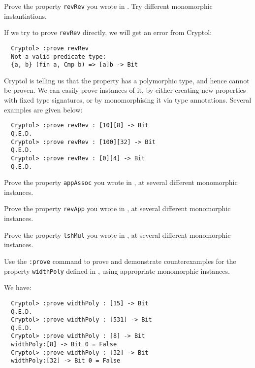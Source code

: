 \begin{Exercise}\label{ex:prove:1}
  Prove the property {\tt revRev} you wrote in
  . Try different
  monomorphic instantiations.
\end{Exercise}
\begin{Answer}
  If we try to prove {\tt revRev} directly, we will get an error from
  Cryptol:
\begin{Verbatim}
  Cryptol> :prove revRev
  Not a valid predicate type:
  {a, b} (fin a, Cmp b) => [a]b -> Bit
\end{Verbatim}
Cryptol is telling us that the property has a polymorphic type, and
hence cannot be proven. We can easily prove instances of it, by either
creating new properties with fixed type signatures\indSignature, or by
monomorphising it via type annotations\indTypeAnnotation. Several
examples are given below:
\begin{Verbatim}
  Cryptol> :prove revRev : [10][8] -> Bit
  Q.E.D.
  Cryptol> :prove revRev : [100][32] -> Bit
  Q.E.D.
  Cryptol> :prove revRev : [0][4] -> Bit
  Q.E.D.
\end{Verbatim}
\end{Answer}

\begin{Exercise}\label{ex:prove:2}
  Prove the property {\tt appAssoc} you wrote in
  , at several
  different monomorphic instances.
\end{Exercise}

\begin{Exercise}\label{ex:prove:3}
  Prove the property {\tt revApp} you wrote in
  , at several
  different monomorphic instances.
\end{Exercise}

\begin{Exercise}\label{ex:prove:4}
  Prove the property {\tt lshMul} you wrote in
  , at several
  different monomorphic instances.
\end{Exercise}

\begin{Exercise}\label{ex:prove:5}
  Use the {\tt :prove} command to prove and demonstrate
  counterexamples for the property {\tt widthPoly} defined in
  , using
  appropriate monomorphic instances.
\end{Exercise}
\begin{Answer}
We have:
\begin{Verbatim}
  Cryptol> :prove widthPoly : [15] -> Bit
  Q.E.D.
  Cryptol> :prove widthPoly : [531] -> Bit
  Q.E.D.
  Cryptol> :prove widthPoly : [8] -> Bit
  widthPoly:[8] -> Bit 0 = False
  Cryptol> :prove widthPoly : [32] -> Bit
  widthPoly:[32] -> Bit 0 = False
\end{Verbatim}
\end{Answer}

